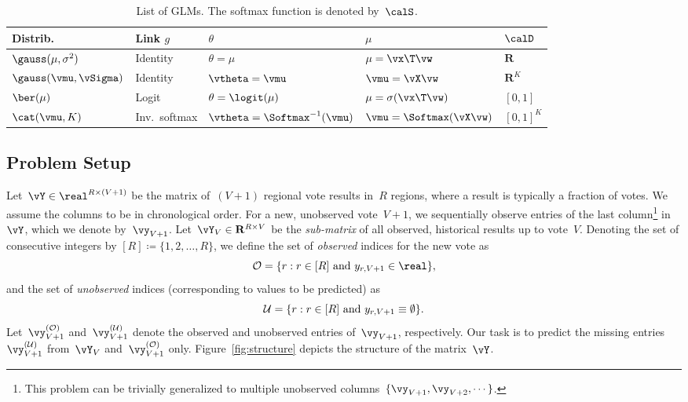\begin{table}
	\caption{
		List of GLMs.
		The softmax function is denoted by~$\calS$.
	}
	\label{tab:glm}
	\begin{tabular}{lllll}
		\toprule
		Distrib.                & Link $g$      & $\theta$                        & $\mu$                      & $\calD$        \\
		\midrule

		$\gauss(\mu, \sigma^2)$ & Identity      & $\theta = \mu$                  & $\mu = \vx\T \vw$          & $\mathbf{R}$   \\
		$\gauss(\vmu, \vSigma)$ & Identity      & $\vtheta = \vmu$                & $\vmu = \vX \vw$           & $\mathbf{R}^K$ \\
		$\ber(\mu)$             & Logit         & $\theta = \logit(\mu)$          & $\mu = \sigma(\vx\T \vw)$  & $[0, 1]$       \\
		$\cat(\vmu, K)$         & Inv.\ softmax & $\vtheta = \Softmax^{-1}(\vmu)$ & $\vmu = \Softmax(\vX \vw)$ & $[0, 1]^K$     \\

		\bottomrule
	\end{tabular}
\end{table}

\subsection{Problem Setup}

Let~$\vY \in \real^{R \times (V+1)}$ be the matrix of~$(V+1)$ regional vote results in~$R$ regions, where a result is typically a fraction of votes.
We assume the columns to be in chronological order.
For a new, unobserved vote~$V+1$, we sequentially observe entries of the last column\footnote{This problem can be trivially generalized to multiple unobserved columns~$\{\vy_{V+1}, \vy_{V+2}, \cdots \}$.} in~$\vY$, which we denote by~$\vy_{V+1}$.
Let~$\vY_V \in \mathbf{R}^{R \times V}$ be the \emph{sub-matrix} of all observed, historical results up to vote~$V$.
Denoting the set of consecutive integers by $[R] \coloneq \{1, 2, \ldots, R \}$, we define the set of \textit{observed} indices for the new vote as
\begin{equation*}
	\Obs = \{ r : r \in [R] \text{ and } y_{r,V+1} \in \real \},
\end{equation*}
and the set of \textit{unobserved} indices (corresponding to values to be predicted) as
\begin{equation*}
	\mathcal{U} = \{ r : r \in [R] \text{ and } y_{r,V+1} \equiv \emptyset \}.
\end{equation*}
Let~$\vy^{(\Obs)}_{V+1}$ and~$\vy^{(\Ubs)}_{V+1}$ denote the observed and unobserved entries of~$\vy_{V+1}$, respectively.
Our task is to predict the missing entries~$\vy^{(\Ubs)}_{V+1}$ from~$\vY_V$ and~$\vy^{(\Obs)}_{V+1}$ only.
Figure~\ref{fig:structure} depicts the structure of the matrix~$\vY$.

